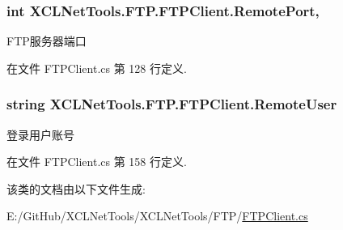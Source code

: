 \subsubsection[{\texorpdfstring{Remote\+Port}{RemotePort}}]{\setlength{\rightskip}{0pt plus 5cm}int X\+C\+L\+Net\+Tools.\+F\+T\+P.\+F\+T\+P\+Client.\+Remote\+Port\hspace{0.3cm}{\ttfamily [get]}, {\ttfamily [set]}}\hypertarget{class_x_c_l_net_tools_1_1_f_t_p_1_1_f_t_p_client_af47bf07406237f3bd179472debf9c84d}{}\label{class_x_c_l_net_tools_1_1_f_t_p_1_1_f_t_p_client_af47bf07406237f3bd179472debf9c84d}


F\+T\+P服务器端口 



在文件 F\+T\+P\+Client.\+cs 第 128 行定义.

\subsubsection[{\texorpdfstring{Remote\+User}{RemoteUser}}]{\setlength{\rightskip}{0pt plus 5cm}string X\+C\+L\+Net\+Tools.\+F\+T\+P.\+F\+T\+P\+Client.\+Remote\+User\hspace{0.3cm}{\ttfamily [set]}}\hypertarget{class_x_c_l_net_tools_1_1_f_t_p_1_1_f_t_p_client_ab97c698dca9a54f44b1e69cb15c1126d}{}\label{class_x_c_l_net_tools_1_1_f_t_p_1_1_f_t_p_client_ab97c698dca9a54f44b1e69cb15c1126d}


登录用户账号 



在文件 F\+T\+P\+Client.\+cs 第 158 行定义.



该类的文档由以下文件生成\+:\begin{DoxyCompactItemize}
\item 
E\+:/\+Git\+Hub/\+X\+C\+L\+Net\+Tools/\+X\+C\+L\+Net\+Tools/\+F\+T\+P/\hyperlink{_f_t_p_client_8cs}{F\+T\+P\+Client.\+cs}\end{DoxyCompactItemize}
